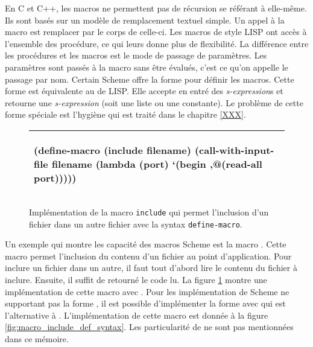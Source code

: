 En C et C++, les macros ne permettent pas de récursion se référant à elle-même.
Ils sont basés sur un modèle de remplacement textuel simple. Un appel à la
macro est remplacer par le corps de celle-ci. Les macros de style LISP ont
accès à l'ensemble des procédure, ce qui leurs donne plus de flexibilité.  La
différence entre les procédures et les macros est le mode de passage de
paramètres.  Les paramètres sont passés à la macro sans être évalués, c'est ce
qu'on appelle le passage par nom.  Certain Scheme offre la forme
 pour définir les macros.  Cette forme est équivalente au
 de LISP. Elle accepte en entré des \textit{s-expression}s et
retourne une \textit{s-expression} (soit une liste ou une constante).  Le
problème de cette forme spéciale est l'hygiène qui est traité dans le chapitre
\ref{XXX}.

\begin{figure}[htbp]
  \begin{tabular}{|l|}\hline
\begin{mplisting}{0.7}
(define-macro (include filename)
  (call-with-input-file
    filename
    (lambda (port)
      `(begin
        ,@(read-all port)))))
\end{mplisting}\\\hline
\end{tabular}

  \caption{Implémentation de la macro \texttt{include} qui permet l'inclusion
  d'un fichier dans un autre fichier avec la syntax \texttt{define-macro}.}

  \label{fig:macro_include}
\end{figure}

Un exemple qui montre les capacité des macros Scheme est la macro
.  Cette macro permet l'inclusion du contenu d'un fichier au
point d'application.  Pour inclure un fichier dans un autre, il faut tout
d'abord lire le contenu du fichier à inclure. Ensuite, il suffit de retourné le
code lu. La figure \ref{fig:macro_include} montre une implémentation de cette
macro avec .  Pour les implémentation de Scheme ne
supportant pas la forme , il est possible d'implémenter
la forme  avec  qui est l'alternative à
. L'implémentation de cette macro est donnée à la figure
\ref{fig:macro_include_def_syntax}. Les particularité de
 ne sont pas mentionnées dans ce mémoire.


